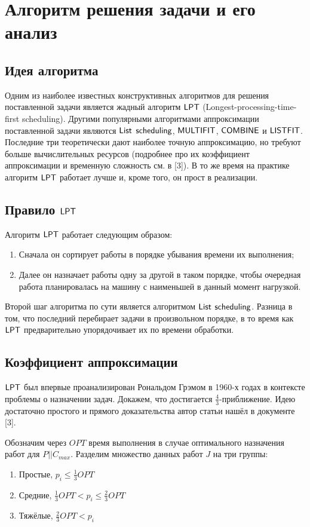 \section{Алгоритм решения задачи и его анализ}

\subsection{Идея алгоритма}
Одним из наиболее известных конструктивных алгоритмов для решения поставленной задачи является жадный алгоритм $\sf{LPT}$ (Longest-processing-time-first scheduling). Другими популярными алгоритмами аппроксимации поставленной задачи являются $\sf{List}$ $\sf{scheduling}$, $\sf{MULTIFIT}$, $\sf{COMBINE}$ и $\sf{LISTFIT}$. Последние три теоретически дают наиболее точную аппроксимацию, но требуют больше вычислительных ресурсов (подробнее про их коэффициент аппроксимации и временную сложность см. в [3]). В то же время на практике алгоритм $\sf{LPT}$ работает лучше и, кроме того, он прост в реализации.

\subsection{Правило $\sf{LPT}$}
Алгоритм $\sf{LPT}$ работает следующим образом:
\begin{enumerate}
    \item Сначала он сортирует работы в порядке убывания времени их выполнения;
    \item Далее он назначает работы одну за другой в таком порядке, чтобы очередная работа планировалась на машину с наименьшей в данный момент нагрузкой. 
\end{enumerate}
Второй шаг алгоритма по сути является алгоритмом $\sf{List}$ $\sf{scheduling}$. Разница в том, что последний перебирает задачи в произвольном порядке, в то время как $\sf{LPT}$ предварительно упорядочивает их по времени обработки.

\subsection{Коэффициент аппроксимации}
$\sf{LPT}$ был впервые проанализирован Рональдом Грэмом в 1960-х годах в контексте проблемы о назначении задач. Докажем, что достигается $\frac{4}{3}$-приближение. Идею достаточно простого и прямого доказательства автор статьи нашёл в документе [3].  

Обозначим через $OPT$ время выполнения в случае оптимального назначения работ для $P||C_{max}$. Разделим множество данных работ $J$ на три группы: 
\begin{enumerate}
    \item Простые, $p_{i} \leq \frac{1}{3}OPT$
    \item Средние, $\frac{1}{3}OPT < p_{i} \leq \frac{2}{3}OPT$
    \item Тяжёлые, $\frac{2}{3}OPT < p_{i}$
\end{enumerate}

